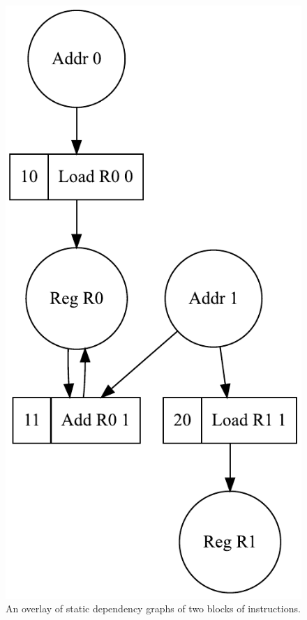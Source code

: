 \begin{figure}
\vspace{-4mm}
\centerline{\includegraphics[scale=0.6]{img/oracle2.pdf}}
\vspace{-3mm}
\caption{An overlay of static dependency graphs of two blocks of instructions.\label{fig-example-graph}}
\vspace{-9mm}
\end{figure}